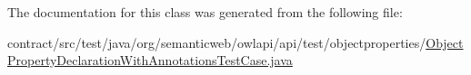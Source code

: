 The documentation for this class was generated from the following file\-:\begin{DoxyCompactItemize}
\item 
contract/src/test/java/org/semanticweb/owlapi/api/test/objectproperties/\hyperlink{_object_property_declaration_with_annotations_test_case_8java}{Object\-Property\-Declaration\-With\-Annotations\-Test\-Case.\-java}\end{DoxyCompactItemize}
